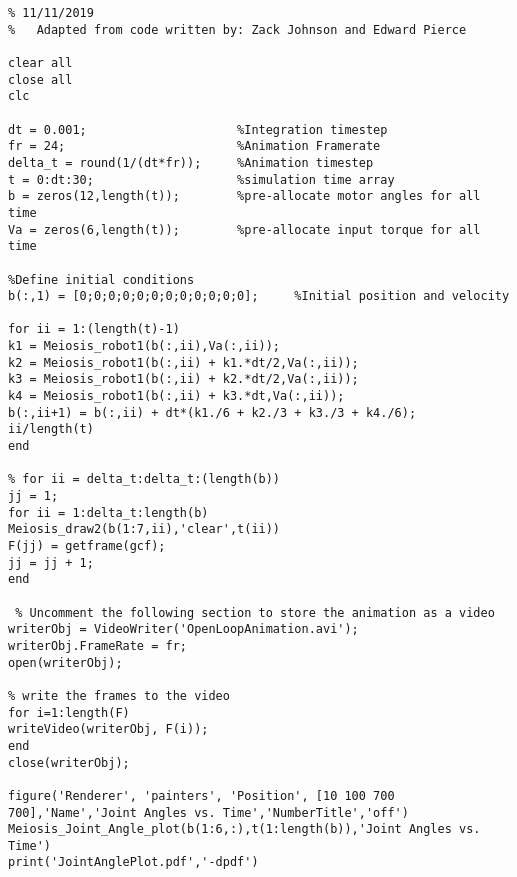 \begin{lstlisting}[frame=lines,style=Matlab-editor,basicstyle = \mlttfamily, caption=Open-Loop Animation Code]
% Open Loop Animation
% 11/11/2019
%   Adapted from code written by: Zack Johnson and Edward Pierce

clear all
close all
clc

dt = 0.001;                     %Integration timestep
fr = 24;                        %Animation Framerate
delta_t = round(1/(dt*fr));     %Animation timestep
t = 0:dt:30;                    %simulation time array
b = zeros(12,length(t));        %pre-allocate motor angles for all time
Va = zeros(6,length(t));        %pre-allocate input torque for all time

%Define initial conditions
b(:,1) = [0;0;0;0;0;0;0;0;0;0;0;0];     %Initial position and velocity

for ii = 1:(length(t)-1)
k1 = Meiosis_robot1(b(:,ii),Va(:,ii));
k2 = Meiosis_robot1(b(:,ii) + k1.*dt/2,Va(:,ii));
k3 = Meiosis_robot1(b(:,ii) + k2.*dt/2,Va(:,ii));
k4 = Meiosis_robot1(b(:,ii) + k3.*dt,Va(:,ii));
b(:,ii+1) = b(:,ii) + dt*(k1./6 + k2./3 + k3./3 + k4./6);
ii/length(t)
end

% for ii = delta_t:delta_t:(length(b))
jj = 1;
for ii = 1:delta_t:length(b)
Meiosis_draw2(b(1:7,ii),'clear',t(ii))
F(jj) = getframe(gcf);
jj = jj + 1;
end

 % Uncomment the following section to store the animation as a video
writerObj = VideoWriter('OpenLoopAnimation.avi');
writerObj.FrameRate = fr;
open(writerObj);

% write the frames to the video
for i=1:length(F)
writeVideo(writerObj, F(i));
end
close(writerObj);

figure('Renderer', 'painters', 'Position', [10 100 700 700],'Name','Joint Angles vs. Time','NumberTitle','off')
Meiosis_Joint_Angle_plot(b(1:6,:),t(1:length(b)),'Joint Angles vs. Time')
print('JointAnglePlot.pdf','-dpdf')
\end{lstlisting}
